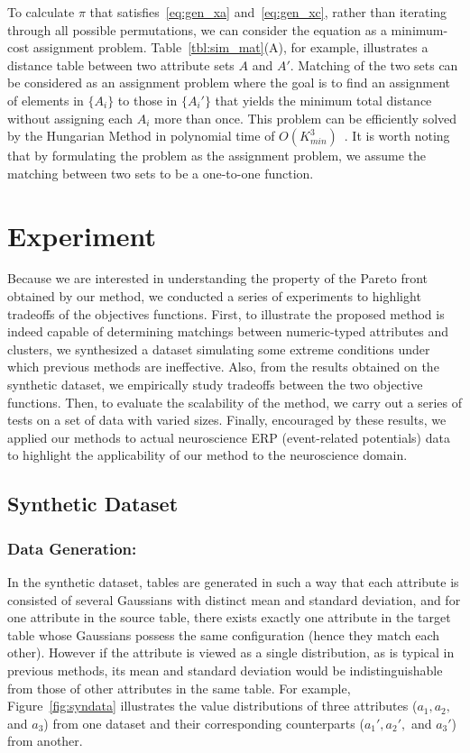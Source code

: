 To calculate $\pi$ that satisfies~\ref{eq:gen_xa} and~\ref{eq:gen_xc}, rather than iterating through all possible permutations, we can consider the equation as a minimum-cost assignment problem. Table~\ref{tbl:sim_mat}(A), for example, illustrates a distance table between two attribute sets $A$ and $A'$. Matching of the two sets can be considered as an assignment problem where the goal is to find an assignment of elements in $\{A_i\}$ to those in $\{A_i'\}$ that yields the minimum total distance without assigning each $A_i$ more than once. This problem can be efficiently solved by the Hungarian Method in polynomial time of $O(K_{min}^3)$~\cite{Kuhn1955}. It is worth noting that by formulating the problem as the assignment problem, we assume the matching between two sets to be a one-to-one function.

\section{Experiment}
\label{sec:experiment}
Because we are interested in understanding the property of the Pareto front obtained by our method, we conducted a series of experiments to highlight tradeoffs of the objectives functions. First, to illustrate the proposed method is indeed capable of determining matchings between numeric-typed attributes and clusters, we synthesized a dataset simulating some extreme conditions under which previous methods are ineffective. Also, from the results obtained on the synthetic dataset, we empirically study tradeoffs between the two objective functions. Then, to evaluate the scalability of the method, we carry out a series of tests on a set of data with varied sizes. Finally, encouraged by these results, we applied our methods to actual neuroscience ERP (event-related potentials) data to highlight the applicability of our method to the neuroscience domain.

\subsection{Synthetic Dataset}
\label{sec:syn_exp}
\subsubsection{Data Generation:}

In the synthetic dataset, tables are generated in such a way that each attribute is consisted of several Gaussians with distinct mean and standard deviation, and for one attribute in the source table, there exists exactly one attribute in the target table whose Gaussians possess the same configuration (hence they match each other). However if the attribute is viewed as a single distribution, as is typical in previous methods, its mean and standard deviation would be indistinguishable from those of other attributes in the same table. For example, Figure~\ref{fig:syndata} illustrates the value distributions of three attributes ($a_1, a_2,$ and $a_3$) from one dataset and their corresponding counterparts ($a_1', a_2',$ and $a_3'$) from another.

